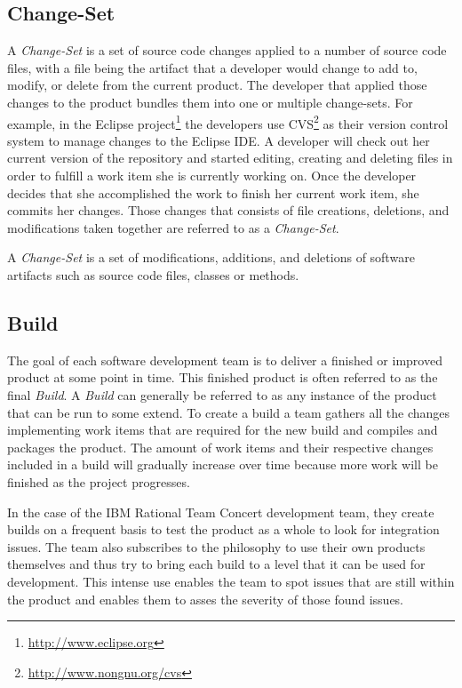\subsection{Change-Set}
A \emph{Change-Set} is a set of source code changes applied to a number of source code files, with a file being the artifact that a developer would change to add to, modify, or delete from the current product. 
The developer that applied those changes to the product bundles them into one or multiple change-sets.
For example, in the Eclipse project\footnote{\url{http://www.eclipse.org}} the developers use CVS\footnote{\url{http://www.nongnu.org/cvs}} as their version control system to manage changes to the Eclipse IDE.
A developer will check out her current version of the repository and started editing, creating and deleting files in order to fulfill a work item she is currently working on.
Once the developer decides that she accomplished the work to finish her current work item, she commits her changes.
Those changes that consists of file creations, deletions, and modifications taken together are referred to as a \emph{Change-Set}. 

\begin{note}
\begin{mydef}
A \emph{Change-Set} is a set of modifications, additions, and deletions of software artifacts such as source code files, classes or methods.
\end{mydef}
\end{note}

\subsection{Build}
The goal of each software development team is to deliver a finished or improved product at some point in time.
This finished product is often referred to as the final \emph{Build}.
A \emph{Build} can generally be referred to as any instance of the product that can be run to some extend.
To create a build a team gathers all the changes implementing work items that are required for the new build and compiles and packages the product.
The amount of work items and their respective changes included in a build will gradually increase over time because more work will be finished as the project progresses.

In the case of the IBM Rational Team Concert development team, they create builds on a frequent basis to test the product as a whole to look for integration issues. 
The team also subscribes to the philosophy to use their own products themselves and thus try to bring each build to a level that it can be used for development.
This intense use enables the team to spot issues that are still within the product and enables them to asses the severity of those found issues.

